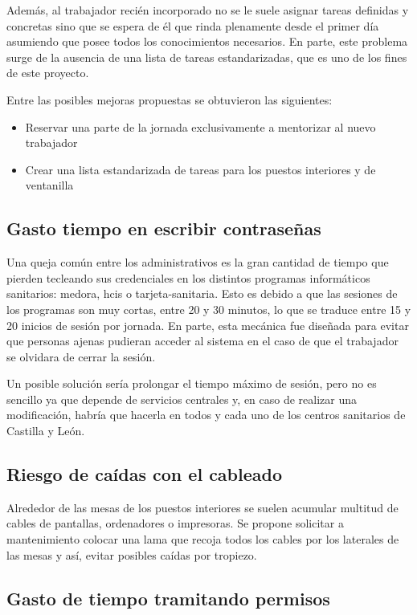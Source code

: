 Además, al trabajador recién incorporado no se le suele asignar tareas definidas y concretas sino que se espera de él que rinda plenamente desde el primer día asumiendo que posee todos los conocimientos necesarios. En parte, este problema surge de la ausencia de una lista de tareas estandarizadas, que es uno de los fines de este proyecto.

Entre las posibles mejoras propuestas se obtuvieron las siguientes:

\begin{itemize}
    \item Reservar una parte de la jornada exclusivamente a mentorizar al nuevo trabajador
    \item Crear una lista estandarizada de tareas para los puestos interiores y de ventanilla
\end{itemize}

\subsection{Gasto tiempo en escribir contraseñas}

Una queja común entre los administrativos es la gran cantidad de tiempo que pierden tecleando sus credenciales en los distintos programas informáticos sanitarios: \Gls{medora}, \Gls{hcis} o \Gls{tarjeta-sanitaria}.
Esto es debido a que las sesiones de los programas son muy cortas, entre 20 y 30 minutos, lo que se traduce entre 15 y 20 inicios de sesión por jornada.
En parte, esta mecánica fue diseñada para evitar que personas ajenas pudieran acceder al sistema en el caso de que el trabajador se olvidara de cerrar la sesión.

Un posible solución sería prolongar el tiempo máximo de sesión, pero no es sencillo ya que depende de servicios centrales y, en caso de realizar una modificación, habría que hacerla en todos y cada uno de los centros sanitarios de Castilla y León.

\subsection{Riesgo de caídas con el cableado}

Alrededor de las mesas de los puestos interiores se suelen acumular multitud de cables de pantallas, ordenadores o impresoras.
Se propone solicitar a mantenimiento colocar una lama que recoja todos los cables por los laterales de las mesas y así, evitar posibles caídas por tropiezo.

\subsection{Gasto de tiempo tramitando permisos}

